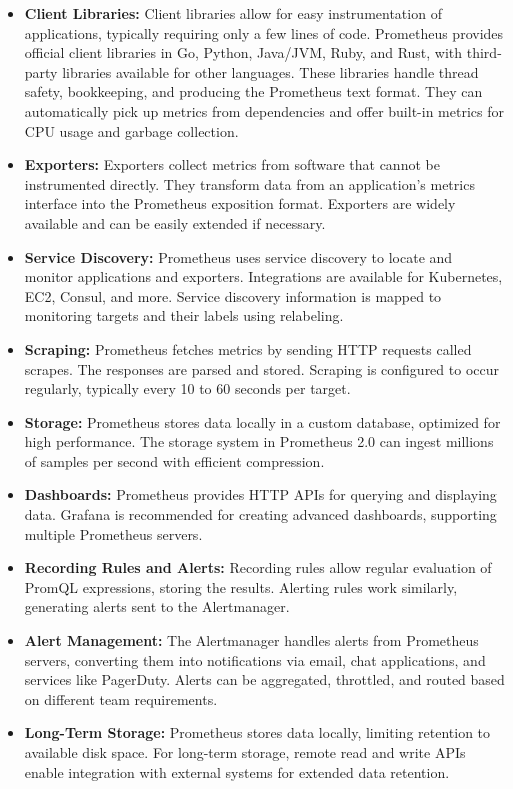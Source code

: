 \begin{itemize}
  \item \textbf{Client Libraries:} Client libraries allow for easy instrumentation of applications, typically requiring only a few lines of code. Prometheus provides official client libraries in Go, Python, Java/JVM, Ruby, and Rust, with third-party libraries available for other languages. These libraries handle thread safety, bookkeeping, and producing the Prometheus text format. They can automatically pick up metrics from dependencies and offer built-in metrics for CPU usage and garbage collection.
  
  \item \textbf{Exporters:} Exporters collect metrics from software that cannot be instrumented directly. They transform data from an application's metrics interface into the Prometheus exposition format. Exporters are widely available and can be easily extended if necessary.
  
  \item \textbf{Service Discovery:} Prometheus uses service discovery to locate and monitor applications and exporters. Integrations are available for Kubernetes, EC2, Consul, and more. Service discovery information is mapped to monitoring targets and their labels using relabeling.
  
  \item \textbf{Scraping:} Prometheus fetches metrics by sending HTTP requests called scrapes. The responses are parsed and stored. Scraping is configured to occur regularly, typically every 10 to 60 seconds per target.
  
  \item \textbf{Storage:} Prometheus stores data locally in a custom database, optimized for high performance. The storage system in Prometheus 2.0 can ingest millions of samples per second with efficient compression.
  
  \item \textbf{Dashboards:} Prometheus provides HTTP APIs for querying and displaying data. Grafana is recommended for creating advanced dashboards, supporting multiple Prometheus servers.
  
  \item \textbf{Recording Rules and Alerts:} Recording rules allow regular evaluation of PromQL expressions, storing the results. Alerting rules work similarly, generating alerts sent to the Alertmanager.
  
  \item \textbf{Alert Management:} The Alertmanager handles alerts from Prometheus servers, converting them into notifications via email, chat applications, and services like PagerDuty. Alerts can be aggregated, throttled, and routed based on different team requirements.
  
  \item \textbf{Long-Term Storage:} Prometheus stores data locally, limiting retention to available disk space. For long-term storage, remote read and write APIs enable integration with external systems for extended data retention.
\end{itemize}



